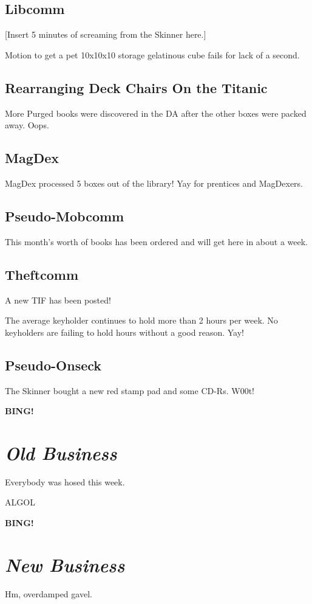 \documentclass[10pt]{article}
\newcommand{\bing}{{\bf BING!} }
\newcommand{\goto}[1]{\bing \vskip 12pt \section*{{\em{#1}}}}
\begin{document}
\subsection*{Libcomm}

[Insert 5 minutes of screaming from the Skinner here.]

Motion to get a pet 10x10x10 storage gelatinous cube fails for lack of a second.

\subsection*{Rearranging Deck Chairs On the Titanic}

More Purged books were discovered in the DA after the other boxes were packed away.  Oops.

\subsection*{MagDex}

MagDex processed 5 boxes out of the library!  Yay for prentices and MagDexers.

\subsection*{Pseudo-Mobcomm}

This month's worth of books has been ordered and will get here in about a week.

\subsection*{Theftcomm}

A new TIF has been posted!

The average keyholder continues to hold more than 2 hours per week.  No keyholders are failing to hold hours without a good reason.  Yay!

\subsection*{Pseudo-Onseck}

The Skinner bought a new red stamp pad and some CD-Rs.  W00t!

\goto{Old Business}

Everybody was hosed this week.

ALGOL

\goto{New Business}

Hm, overdamped gavel.
\end{document}
